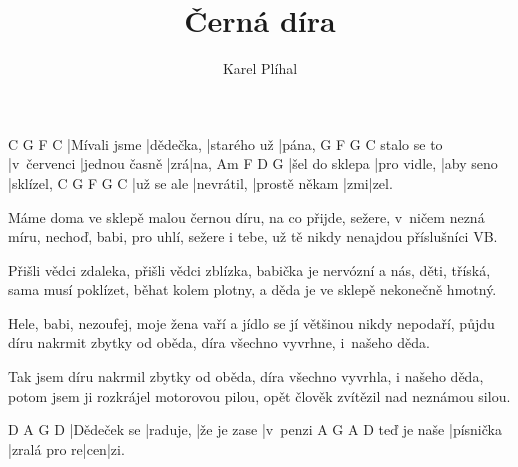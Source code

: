 \documentclass{song}
\author{Karel Plíhal}
\title{Černá díra}
\begin{document}
\strophe
C            G         F           C
|Mívali jsme |dědečka, |starého už |pána,
            G           F             G   C
stalo se to |v~červenci |jednou časně |zrá|na,
Am             F           D         G
|šel do sklepa |pro vidle, |aby seno |sklízel,
C          G          F             G   C
|už se ale |nevrátil, |prostě někam |zmi|zel.
\endstrophe

\strophe*
Máme doma ve sklepě malou černou díru,
na co přijde, sežere, v~ničem nezná míru,
nechoď, babi, pro uhlí, sežere i tebe,
už tě nikdy nenajdou příslušníci VB.
\endstrophe

\strophe*
Přišli vědci zdaleka, přišli vědci zblízka,
babička je nervózní a nás, děti, tříská,
sama musí poklízet, běhat kolem plotny,
a děda je ve sklepě nekonečně hmotný.
\endstrophe

\strophe*
Hele, babi, nezoufej, moje žena vaří
a jídlo se jí většinou nikdy nepodaří,
půjdu díru nakrmit zbytky od oběda,
díra všechno vyvrhne, i~našeho děda.
\endstrophe

\strophe*
Tak jsem díru nakrmil zbytky od oběda,
díra všechno vyvrhla, i našeho děda,
potom jsem ji rozkrájel motorovou pilou,
opět člověk zvítězil nad neznámou silou.
\endstrophe

\strophe
D           A        G           D   
|Dědeček se |raduje, |že je zase |v~penzi
            A         G            A   D
teď je naše |písnička |zralá pro re|cen|zi.
\endstrophe
\end{document}

